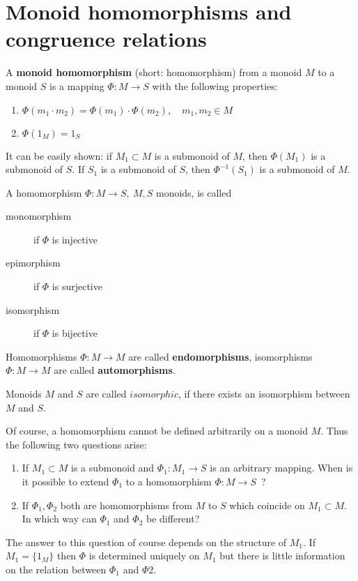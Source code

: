 \section{Monoid homomorphisms and congruence relations}

\begin{definition}
A {\bf monoid homomorphism} (short: homomorphism) from a monoid $M$ to a monoid
$S$ is a mapping $\Phi : M \to S$ with the following properties:
\begin{enumerate}
  \item $\Phi(m_1 \cdot m_2) = \Phi(m_1) \cdot \Phi(m_2), \quad m_1, m_2 \in M$
  \item $\Phi(1_M) = 1_S$
\end{enumerate}
\end{definition}

It can be easily shown: if $M_1 \subset M$ is a submonoid of $M$, then
$\Phi(M_1)$ is a submonoid of $S$. If $S_1$ is a submonoid of $S$, then
$\Phi^{-1}(S_1)$ is a submonoid of $M$.

A homomorphism $\Phi : M \to S, \ M, S$ monoids, is called
\begin{description}
  \item[monomorphism] if $\Phi$ is injective
  \item[epimorphism] if $\Phi$ is surjective
  \item[isomorphism] if $\Phi$ is bijective
\end{description}

Homomorphisms $\Phi : M \to M$ are called {\bf endomorphisms}, isomorphisms
$\Phi : M \to M$ are called {\bf automorphisms}.

Monoids $M$ and $S$ are called $isomorphic$, if there exists an isomorphism
between $M$ and $S$.

Of course, a homomorphism cannot be defined arbitrarily on a monoid $M$.
Thus the following two questions arise:
\begin{enumerate}
  \item If $M_1 \subset M$ is a submonoid and $\Phi_1 : M_1 \to S$ is an arbitrary
mapping. When is it possible to extend $\Phi_1$ to a homomorphism $\Phi
: M \to S$\ ?
	\item If $\Phi_1, \Phi_2$ both are homomorphisms from $M$ to $S$ which
	coincide on $M_1 \subset M$. In which way can $\Phi_1$ and $\Phi_2$ be
	different? 
\end{enumerate}

The answer to this question of course depends on the structure of $M_1$. If
$M_1 = \{ 1_M \}$ then $\Phi$ is determined uniquely on $M_1$ but there is
little information on the relation between $\Phi_1$ and $\Phi2$.

